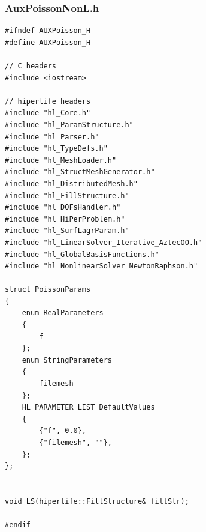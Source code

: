 \documentclass[]{article}
\begin{document}
\subsubsection{AuxPoissonNonL.h} \label{sec: a.h}
\begin{lstlisting}
#ifndef AUXPoisson_H
#define AUXPoisson_H
	
// C headers
#include <iostream>
	
// hiperlife headers
#include "hl_Core.h"
#include "hl_ParamStructure.h"
#include "hl_Parser.h"
#include "hl_TypeDefs.h"
#include "hl_MeshLoader.h"
#include "hl_StructMeshGenerator.h"
#include "hl_DistributedMesh.h"
#include "hl_FillStructure.h"
#include "hl_DOFsHandler.h"
#include "hl_HiPerProblem.h"
#include "hl_SurfLagrParam.h"
#include "hl_LinearSolver_Iterative_AztecOO.h"
#include "hl_GlobalBasisFunctions.h"
#include "hl_NonlinearSolver_NewtonRaphson.h"
	
struct PoissonParams
{
	enum RealParameters
	{
		f
	};
	enum StringParameters
	{
		filemesh
	};
	HL_PARAMETER_LIST DefaultValues
	{
		{"f", 0.0},
		{"filemesh", ""},
	};
};
	
	
void LS(hiperlife::FillStructure& fillStr);
	
#endif
	
\end{lstlisting}
\end{document}

